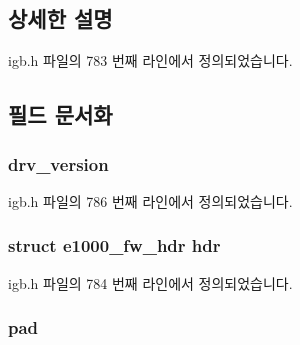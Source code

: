 \subsection{상세한 설명}


igb.\+h 파일의 783 번째 라인에서 정의되었습니다.



\subsection{필드 문서화}
\subsubsection[{\texorpdfstring{drv\+\_\+version}{drv_version}}]{ drv\+\_\+version}\hypertarget{structe1000__fw__drv__info_aa15718f16403ba5603b39529c4e6617e}{}\label{structe1000__fw__drv__info_aa15718f16403ba5603b39529c4e6617e}


igb.\+h 파일의 786 번째 라인에서 정의되었습니다.

\subsubsection[{\texorpdfstring{hdr}{hdr}}]{\setlength{\rightskip}{0pt plus 5cm}struct {\bf e1000\+\_\+fw\+\_\+hdr} hdr}\hypertarget{structe1000__fw__drv__info_a9367eb5902c7a6fbc3272c5a4d9f9377}{}\label{structe1000__fw__drv__info_a9367eb5902c7a6fbc3272c5a4d9f9377}


igb.\+h 파일의 784 번째 라인에서 정의되었습니다.

\subsubsection[{\texorpdfstring{pad}{pad}}]{ pad}\hypertarget{structe1000__fw__drv__info_aa94b12c4dc26f2a62469a0e89f216cf9}{}\label{structe1000__fw__drv__info_aa94b12c4dc26f2a62469a0e89f216cf9}


